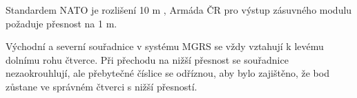 Standardem NATO je rozlišení 10 m \cite{wiki}, Armáda ČR pro výstup
zásuvného modulu požaduje přesnost na 1 m.

Východní a severní souřadnice v systému MGRS se vždy vztahují k levému
dolnímu rohu čtverce. Při přechodu na nižší přesnost se souřadnice
nezaokrouhlují, ale přebytečné číslice se odříznou, aby bylo
zajištěno, že bod zůstane ve správném čtverci s nižší přesností.

